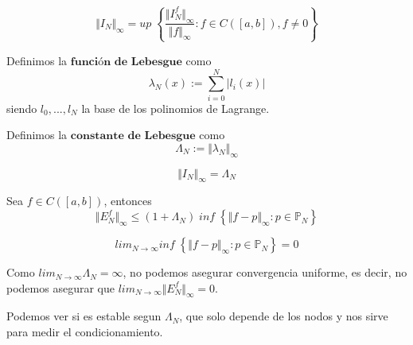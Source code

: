 \begin{nprop}
\[ \Vert I_N \Vert _\infty = up \; \left\lbrace \frac{\Vert I_N^f \Vert _\infty}{\Vert f \Vert _\infty} : f \in C( \left[ a,b \right] ), f \neq 0 \right\rbrace \]
\end{nprop}

\newpage

\begin{ndef}
Definimos la $\textbf{función de Lebesgue}$ como
\[ \lambda _N(x) := \sum_{i=0}^N \vert l_i(x) \vert \]
siendo {$l_0,...,l_N$} la base de los polinomios de Lagrange.
\end{ndef}

\begin{ndef}
Definimos la $\textbf{constante de Lebesgue}$ como
\[ \Lambda _N := \Vert \lambda _N \Vert _\infty \]
\end{ndef}

\begin{nprop}
\[ \Vert I_N \Vert _\infty = \Lambda _N \]
\end{nprop}

\begin{ncor}
Sea $f \in C([a,b])$, entonces
\[ \Vert E_N^f \Vert _\infty \leq (1+\Lambda _N) \; inf \; \left\lbrace \Vert f-p \Vert _\infty : p \in \mathbb{P} _N \right\rbrace \]
\end{ncor}

\begin{nth}
\[ lim_{N\rightarrow \infty} inf \; \left\lbrace \Vert f-p \Vert _\infty : p \in \mathbb{P} _N \right\rbrace = 0 \]
\end{nth}

Como $lim _{N\rightarrow \infty} \Lambda _N = \infty$, no podemos asegurar convergencia uniforme, es decir, no podemos asegurar que $lim_{N\rightarrow \infty} \Vert E_N^f \Vert _\infty = 0$. 

Podemos ver si es estable segun $\Lambda _N$, que solo depende de los nodos y nos sirve para medir el condicionamiento.


